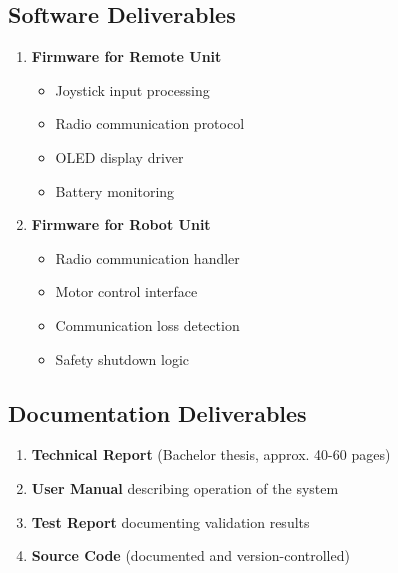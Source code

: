 \subsection*{Software Deliverables}
\begin{enumerate}
    \item \textbf{Firmware for Remote Unit}
    \begin{itemize}
        \item Joystick input processing
        \item Radio communication protocol
        \item OLED display driver
        \item Battery monitoring
    \end{itemize}
    
    \item \textbf{Firmware for Robot Unit}
    \begin{itemize}
        \item Radio communication handler
        \item Motor control interface
        \item Communication loss detection
        \item Safety shutdown logic
    \end{itemize}
\end{enumerate}

\subsection*{Documentation Deliverables}
\begin{enumerate}
    \item \textbf{Technical Report} (Bachelor thesis, approx. 40-60 pages)
    \item \textbf{User Manual} describing operation of the system
    \item \textbf{Test Report} documenting validation results
    \item \textbf{Source Code} (documented and version-controlled)
\end{enumerate}
